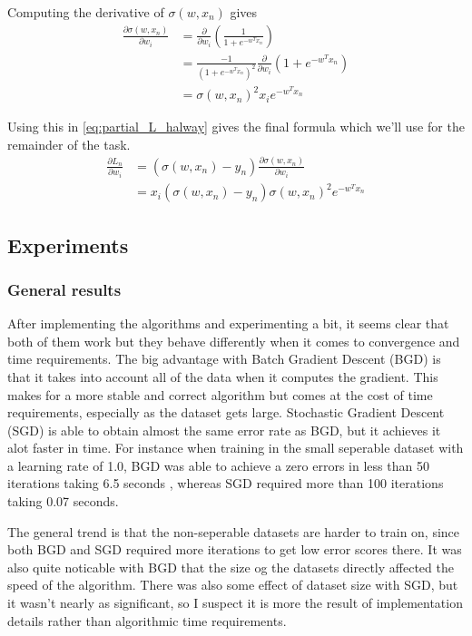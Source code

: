 \documentclass{article}
\begin{document}
Computing the derivative of $\sigma(w,x_n)$ gives
\begin{align}
	\frac{\partial \sigma(w,x_n)}{\partial w_i} &= \frac{\partial}{\partial w_i}\left( \frac{1}{1+e^{-w^Tx_n}} \right) \\
	&= \frac{-1}{(1+e^{-w^T x_n})^2} \frac{\partial}{\partial w_i}(1 + e^{-w^Tx_n}) \\
	&= \sigma(w,x_n)^2 x_i e^{-w^T x_n}
\end{align}

Using this in \cref{eq:partial_L_halway} gives the final formula which we'll use for the remainder of the task. 
\begin{align}
	\frac{\partial L_n}{\partial w_i} &= (\sigma(w,x_n) - y_n) \frac{\partial \sigma(w,x_n)}{\partial w_i}  \\
	&= x_i (\sigma(w,x_n) - y_n) \sigma(w,x_n)^2 e^{-w^T x_n}
\end{align} 

\subsection{Experiments}
\subsubsection{General results}
After implementing the algorithms and experimenting a bit, it seems clear that both of them work but they behave differently when it comes to convergence and time requirements. The big advantage with Batch Gradient Descent (BGD) is that it takes into account all of the data when it computes the gradient. This makes for a more stable and correct algorithm but comes at the cost of time requirements, especially as the dataset gets large. 
Stochastic Gradient Descent (SGD) is able to obtain almost the same error rate as BGD, but it achieves it alot faster in time. For instance when training in the small seperable dataset with a learning rate of 1.0, BGD was able to achieve a zero errors in less than 50 iterations taking 6.5 seconds , whereas SGD required more than 100 iterations taking 0.07 seconds. 

The general trend is that the non-seperable datasets are harder to train on, since both BGD and SGD required more iterations to get low error scores there. It was also quite noticable with BGD that the size og the datasets directly affected the speed of the algorithm. There was also some effect of dataset size with SGD, but it wasn't nearly as significant, so I suspect it is more the result of implementation details rather than algorithmic time requirements. 
\end{document}
